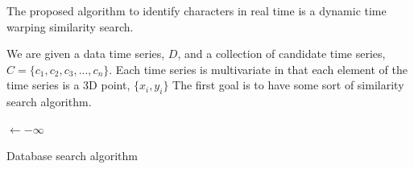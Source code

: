 The proposed algorithm to identify characters in real time is a dynamic time warping similarity search. 


We are given a data time series, \(D\), and a collection of candidate time series, \( C = \{c_1, c_2, c_3, ..., c_n\}\).
Each time series is multivariate in that each element of the time series is a 3D point, \(\{x_i, y_i\}\)
The first goal is to have some sort of similarity search algorithm.
\begin{algorithm}[h]



 \Input{\Collection, \D}
 \Best$\leftarrow -\infty$\;
 \Return{\Distance, \Location}
 \caption{Database search algorithm}
\end{algorithm}


